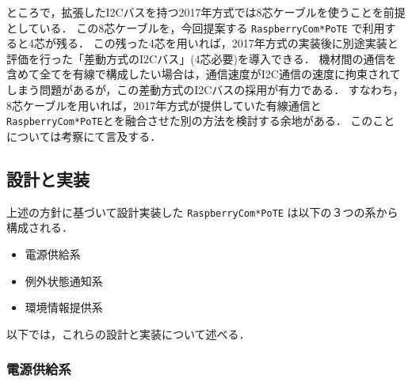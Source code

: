 {ところで，拡張したI2Cバスを持つ2017年方式では8芯ケーブルを使うことを前提としている．
この8芯ケーブルを，今回提案する {\tt Raspberry\-Com*PoTE} で利用すると4芯が残る．
この残った4芯を用いれば，2017年方式の実装後に別途実装と評価を行った「差動方式のI2Cバス」(4芯必要)を導入できる．
機材間の通信を含めて全てを有線で構成したい場合は，通信速度がI2C通信の速度に拘束されてしまう問題があるが，この差動方式のI2Cバスの採用が有力である．
すなわち，8芯ケーブルを用いれば，2017年方式が提供していた有線通信と {\tt Raspberry\-Com*PoTE}とを融合させた別の方法を検討する余地がある．
このことについては考察にて言及する．



\subsection{設計と実装}

上述の方針に基づいて設計実装した {\tt Raspberry\-Com*PoTE} は以下の３つの系から構成される．

\begin{itemize}
\item 電源供給系
\item 例外状態通知系
\item 環境情報提供系
\end{itemize}

以下では，これらの設計と実装について述べる．


\subsubsection{電源供給系}


}
